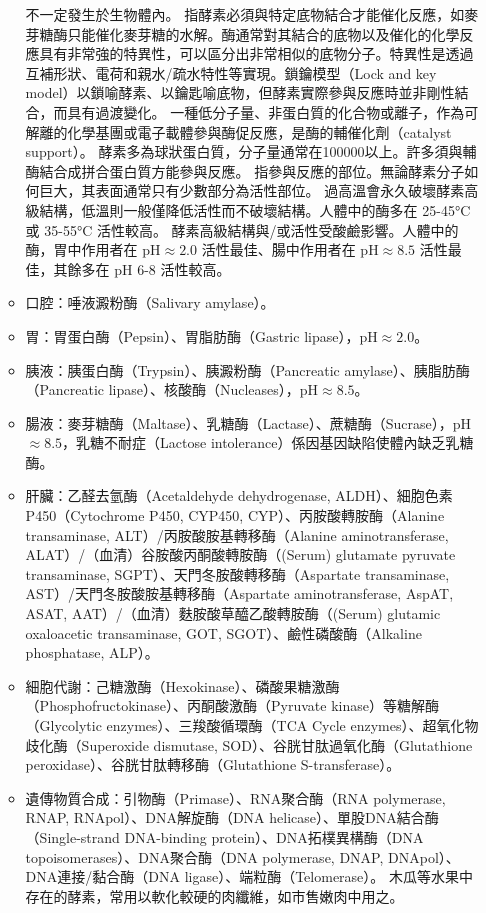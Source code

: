 \documentclass[a4paper,12pt]{report}
\begin{document}
\begin{itemize}
\begin{itemize}
不一定發生於生物體內。
指酵素必須與特定底物結合才能催化反應，如麥芽糖酶只能催化麥芽糖的水解。酶通常對其結合的底物以及催化的化學反應具有非常強的特異性，可以區分出非常相似的底物分子。特異性是透過互補形狀、電荷和親水/疏水特性等實現。鎖鑰模型（Lock and key model）以鎖喻酵素、以鑰匙喻底物，但酵素實際參與反應時並非剛性結合，而具有過渡變化。
一種低分子量、非蛋白質的化合物或離子，作為可解離的化學基團或電子載體參與酶促反應，是酶的輔催化劑（catalyst support）。
酵素多為球狀蛋白質，分子量通常在100000以上。許多須與輔酶結合成拼合蛋白質方能參與反應。
指參與反應的部位。無論酵素分子如何巨大，其表面通常只有少數部分為活性部位。
過高溫會永久破壞酵素高級結構，低溫則一般僅降低活性而不破壞結構。人體中的酶多在 25-45°C 或 35-55°C 活性較高。
酵素高級結構與/或活性受酸鹼影響。人體中的酶，胃中作用者在 pH$\approx 2.0$ 活性最佳、腸中作用者在 pH$\approx 8.5$ 活性最佳，其餘多在 pH 6-8 活性較高。
\bit
\item 口腔：唾液澱粉酶（Salivary amylase）。
\item 胃：胃蛋白酶（Pepsin）、胃脂肪酶（Gastric lipase），pH$\approx 2.0$。
\item 胰液：胰蛋白酶（Trypsin）、胰澱粉酶（Pancreatic amylase）、胰脂肪酶（Pancreatic lipase）、核酸酶（Nucleases），pH$\approx 8.5$。
\item 腸液：麥芽糖酶（Maltase）、乳糖酶（Lactase）、蔗糖酶（Sucrase），pH$\approx 8.5$，乳糖不耐症（Lactose intolerance）係因基因缺陷使體內缺乏乳糖酶。
\item 肝臟：乙醛去氫酶（Acetaldehyde dehydrogenase, ALDH）、細胞色素P450（Cytochrome P450, CYP450, CYP）、丙胺酸轉胺酶（Alanine transaminase, ALT）/丙胺酸胺基轉移酶（Alanine aminotransferase, ALAT）/（血清）谷胺酸丙酮酸轉胺酶（(Serum) glutamate pyruvate transaminase, SGPT）、天門冬胺酸轉移酶（Aspartate transaminase, AST）/天門冬胺酸胺基轉移酶（Aspartate aminotransferase, AspAT, ASAT, AAT）/（血清）麩胺酸草醯乙酸轉胺酶（(Serum) glutamic oxaloacetic transaminase, GOT, SGOT）、鹼性磷酸酶（Alkaline phosphatase, ALP）。
\item 細胞代謝：己糖激酶（Hexokinase）、磷酸果糖激酶（Phosphofructokinase）、丙酮酸激酶（Pyruvate kinase）等糖解酶（Glycolytic enzymes）、三羧酸循環酶（TCA Cycle enzymes）、超氧化物歧化酶（Superoxide dismutase, SOD）、谷胱甘肽過氧化酶（Glutathione peroxidase）、谷胱甘肽轉移酶（Glutathione S-transferase）。
\item 遺傳物質合成：引物酶（Primase）、RNA聚合酶（RNA polymerase, RNAP, RNApol）、DNA解旋酶（DNA helicase）、單股DNA結合酶（Single-strand DNA-binding protein）、DNA拓樸異構酶（DNA topoisomerases）、DNA聚合酶（DNA polymerase, DNAP, DNApol）、DNA連接/黏合酶（DNA ligase）、端粒酶（Telomerase）。
\eit
{}
木瓜等水果中存在的酵素，常用以軟化較硬的肉纖維，如市售嫩肉中用之。



\end{itemize}
\end{itemize}
\end{document}
